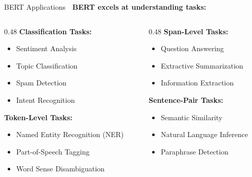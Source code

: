 \documentclass[aspectratio=169]{beamer}
\begin{document}
\begin{frame}[shrink=10]{BERT Applications 🚀}
\small
\textbf{BERT excels at understanding tasks:}

\vspace{1em}

\begin{columns}[T]
\begin{column}{0.48\textwidth}
\textbf{Classification Tasks:}
\begin{itemize}\setlength{\itemsep}{0pt}
    \item Sentiment Analysis
    \item Topic Classification
    \item Spam Detection
    \item Intent Recognition
\end{itemize}

\vspace{0.5em}

\textbf{Token-Level Tasks:}
\begin{itemize}\setlength{\itemsep}{0pt}
    \item Named Entity Recognition (NER)
    \item Part-of-Speech Tagging
    \item Word Sense Disambiguation
\end{itemize}
\end{column}

\begin{column}{0.48\textwidth}
\textbf{Span-Level Tasks:}
\begin{itemize}\setlength{\itemsep}{0pt}
    \item Question Answering
    \item Extractive Summarization
    \item Information Extraction
\end{itemize}

\vspace{0.5em}

\textbf{Sentence-Pair Tasks:}
\begin{itemize}\setlength{\itemsep}{0pt}
    \item Semantic Similarity
    \item Natural Language Inference
    \item Paraphrase Detection
\end{itemize}
\end{column}
\end{columns}


\end{frame}
\end{document}
